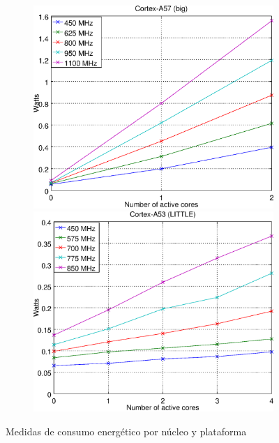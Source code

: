 \begin{figure}
\begin{subfigure}{0.49\textwidth}
    \end{subfigure}
\hspace{0.2cm}%
    \begin{subfigure}{0.49\textwidth}
      \centering
      \includegraphics[width=1\linewidth]{Plots/Modelos_consumo/juno_big.eps}

      \vspace{1cm}

      \includegraphics[width=1\linewidth]{Plots/Modelos_consumo/juno_little.eps}
      \caption{\juno}
      \label{fig:modelo_consumo-juno}
    \end{subfigure}  

	\caption{Medidas de consumo energético por núcleo y plataforma}
  \label{fig:modelo_consumo}
\end{figure}


